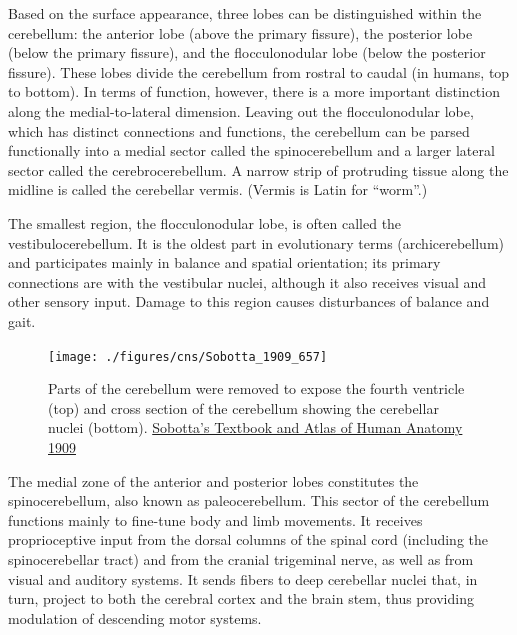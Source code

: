 Based on the surface appearance, three lobes can be distinguished within the cerebellum: the anterior lobe (above the primary fissure), the posterior lobe (below the primary fissure), and the flocculonodular lobe (below the posterior fissure). These lobes divide the cerebellum from rostral to caudal (in humans, top to bottom). In terms of function, however, there is a more important distinction along the medial-to-lateral dimension. Leaving out the flocculonodular lobe, which has distinct connections and functions, the cerebellum can be parsed functionally into a medial sector called the spinocerebellum and a larger lateral sector called the cerebrocerebellum. A narrow strip of protruding tissue along the midline is called the cerebellar vermis. (Vermis is Latin for ``worm''.)

The smallest region, the flocculonodular lobe, is often called the vestibulocerebellum. It is the oldest part in evolutionary terms (archicerebellum) and participates mainly in balance and spatial orientation; its primary connections are with the vestibular nuclei, although it also receives visual and other sensory input. Damage to this region causes disturbances of balance and gait.



\begin{figure}

{\centering \texttt{[image: ./figures/cns/Sobotta\_1909\_657]} 

}

\caption{Parts of the cerebellum were removed to expose the fourth ventricle (top) and cross section of the cerebellum showing the cerebellar nuclei (bottom). \href{https://commons.wikimedia.org/wiki/File:Sobo_1909_655.png}{Sobotta's Textbook and Atlas of Human Anatomy 1909}}\label{fig:cerebellumcut}
\end{figure}

The medial zone of the anterior and posterior lobes constitutes the spinocerebellum, also known as paleocerebellum. This sector of the cerebellum functions mainly to fine-tune body and limb movements. It receives proprioceptive input from the dorsal columns of the spinal cord (including the spinocerebellar tract) and from the cranial trigeminal nerve, as well as from visual and auditory systems. It sends fibers to deep cerebellar nuclei that, in turn, project to both the cerebral cortex and the brain stem, thus providing modulation of descending motor systems.

